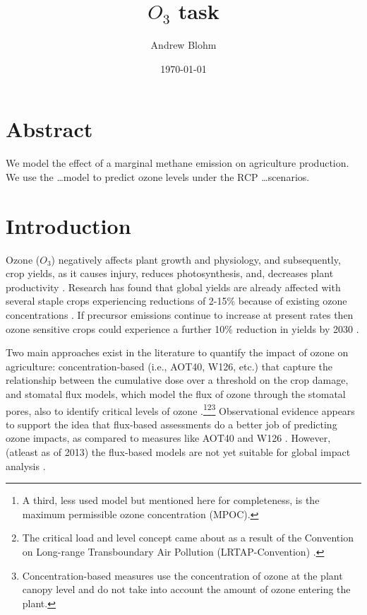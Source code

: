 \documentclass[10pt]{amsart}
\title{$O_{3}$ task}
\author{Andrew Blohm}
\date{\today}
\begin{document}
\maketitle

\section{Abstract}
We model the effect of a marginal methane emission on agriculture production.
We use the \ldots model to predict ozone levels under the RCP \ldots scenarios.


\section{Introduction}
Ozone ($O_{3}$) negatively affects plant growth and physiology, and subsequently, crop yields, as it causes injury, reduces photosynthesis, and, decreases plant productivity \parencite{mishra:2013aa}. 
Research has found that global yields are already affected with several staple crops experiencing reductions of 2-15\% because of existing ozone concentrations \parencite{Avnery2013}. 
If precursor emissions continue to increase at present rates then ozone sensitive crops could experience a further 10\% reduction in yields by 2030 \parencite{Averny2013}.

Two main approaches exist in the literature to quantify the impact of ozone on agriculture: concentration-based (i.e., AOT40, W126, etc.) that capture the relationship between the cumulative dose over a threshold on the crop damage, and stomatal flux models, which model the flux of ozone through the stomatal pores, also to identify critical levels of ozone \parencite{mills:2007aa}.\footnote{A third, less used model but mentioned here for completeness, is the maximum permissible ozone concentration (MPOC)\parencite{mills:2007aa}.}\footnote{The critical load and level concept came about as a result of the Convention on Long-range Transboundary Air Pollution (LRTAP-Convention) \parencite{clrtap:2015aa}.}\footnote{Concentration-based measures use the concentration of ozone at the plant canopy level and do not take into account the amount of ozone entering the plant.}
Observational evidence appears to support the idea that flux-based assessments do a better job of predicting ozone impacts, as compared to measures like AOT40 and W126 \parencite{Avnery2013}.
However, (atleast as of 2013) the flux-based models are not yet suitable for global impact analysis \parencite{Avnery2013}.
\end{document}
